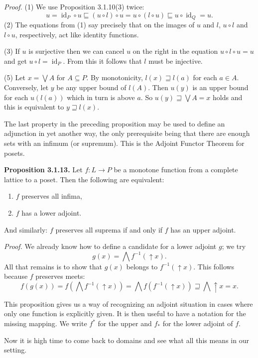 \documentclass[11pt]{article}
\newcommand{\leanmarker}[2]{%
  \Needspace{3\baselineskip}%
  \marginnote{\hyperlink{#1}{\color{LeanTeal}\fbox{\scriptsize Lean}}}%
  \hypertarget{#1}{\textbf{#2.}}%
}
\begin{document}
\emph{Proof.} (1) We use Proposition 3.1.10(3) twice:
\[
  u=\operatorname{id}_P\circ u \sqsubseteq (u\circ l)\circ u
    =u\circ(l\circ u)\sqsubseteq u\circ\operatorname{id}_Q=u.
\]
(2) The equations from (1) say precisely that on the images of $u$ and $l$, $u\circ l$ and $l\circ u$, respectively, act like identity functions.

(3) If $u$ is surjective then we can cancel $u$ on the right in the equation $u\circ l\circ u=u$ and get $u\circ l=\operatorname{id}_P$. From this it follows that $l$ must be injective.

(5) Let $x=\bigvee A$ for $A\subseteq P$. By monotonicity, $l(x)\sqsupseteq l(a)$ for each $a\in A$. Conversely, let $y$ be any upper bound of $l(A)$. Then $u(y)$ is an upper bound for each $u(l(a))$ which in turn is above $a$. So $u(y)\sqsupseteq \bigvee A=x$ holds and this is equivalent to $y\sqsupseteq l(x)$.

The last property in the preceding proposition may be used to define an adjunction in yet another way, the only prerequisite being that there are enough sets with an infimum (or supremum). This is the Adjoint Functor Theorem for posets.

\leanmarker{prop-3-1-13}{Proposition 3.1.13} Let $f:L\to P$ be a monotone function from a complete lattice to a poset. Then the following are equivalent:
\begin{enumerate}
\item $f$ preserves all infima,
\item $f$ has a lower adjoint.
\end{enumerate}
And similarly: $f$ preserves all suprema if and only if $f$ has an upper adjoint.

\emph{Proof.} We already know how to define a candidate for a lower adjoint $g$; we try
\[
  g(x)=\bigwedge f^{-1}(\uparrow x).
\]
All that remains is to show that $g(x)$ belongs to $f^{-1}(\uparrow x)$. This follows because $f$ preserves meets:
\[
  f(g(x))=f\left(\bigwedge f^{-1}(\uparrow x)\right)
    =\bigwedge f(f^{-1}(\uparrow x))\sqsupseteq \bigwedge\uparrow x=x.
\]

This proposition gives us a way of recognizing an adjoint situation in cases where only one function is explicitly given. It is then useful to have a notation for the missing mapping. We write $f^*$ for the upper and $f_*$ for the lower adjoint of $f$.

Now it is high time to come back to domains and see what all this means in our setting.
\end{document}
